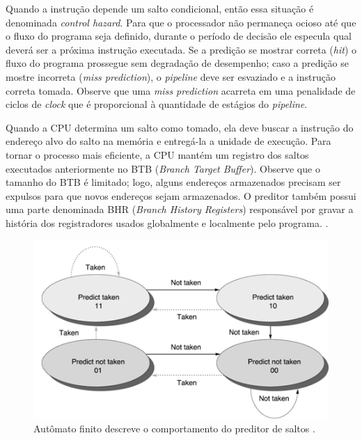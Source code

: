 Quando a instru\c{c}\~{a}o depende um salto condicional, ent\~{a}o essa situa\c{c}\~{a}o \'{e} denominada \textit{control hazard}. Para que o processador n\~{a}o permane\c{c}a ocioso at\'{e} que o fluxo do programa seja definido, durante o per\'{i}odo de decis\~{a}o ele especula qual dever\'{a} ser a pr\'{o}xima instru\c{c}\~{a}o executada. Se a predi\c{c}\~{a}o se mostrar correta (\textit{hit}) o fluxo do programa prossegue sem degrada\c{c}\~{a}o de desempenho; caso a predi\c{c}\~{a}o se mostre incorreta (\textit{miss prediction}), o \textit{pipeline} deve ser esvaziado e a instru\c{c}\~{a}o correta tomada. Observe que uma \textit{miss prediction} acarreta em uma penalidade de ciclos de \textit{clock} que \'{e} proporcional \`{a} quantidade de est\'{a}gios do \textit{pipeline}.

Quando a CPU determina um salto como tomado, ela deve buscar a instru\c{c}\~{a}o do endere\c{c}o alvo do salto na mem\'{o}ria e entreg\'{a}-la a unidade de execu\c{c}\~{a}o. Para tornar o processo mais eficiente, a CPU mant\'{e}m um registro dos saltos executados anteriormente no BTB (\textit{Branch Target Buffer}). Observe que o tamanho do BTB \'{e} limitado; logo, alguns endere\c{c}os armazenados precisam ser expulsos para que novos endere\c{c}os sejam armazenados.
O preditor tamb\'{e}m possui uma parte denominada BHR (\textit{Branch History Registers}) respons\'{a}vel por gravar a hist\'{o}ria dos registradores usados globalmente e localmente pelo programa. \cite{Jean-Pierre06predictingsecret}.

\begin{figure}[ht]
	\centering
	\includegraphics[width=1\textwidth]{figures/automato.png}
	\caption{Aut\^{o}mato finito descreve o comportamento do preditor de saltos \cite{493986}.}
	\label{fig:Fig_automato}
\end{figure}

